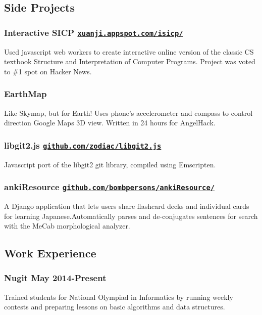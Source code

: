 \documentclass[letterpaper]{article}
\begin{document}
\begin{center}
\section*{Side Projects}
\end{center}
\subsubsection*{Interactive SICP \hfill \href{http://xuanji.appspot.com/isicp/}{\tt xuanji.appspot.com/isicp/}}
Used javascript web workers to create interactive online version of the classic CS textbook Structure and Interpretation of Computer Programs. Project was voted to \#1 spot on Hacker News.

\subsubsection*{EarthMap}
Like Skymap, but for Earth! Uses phone's accelerometer and compass to control direction Google Maps 3D view. Written in 24 hours for AngelHack.

\subsubsection*{libgit2.js \hfill \href{https://github.com/zodiac/libgit2.js}{\tt github.com/zodiac/libgit2.js}}
Javascript port of the libgit2 git library, compiled using Emscripten.

\subsubsection*{ankiResource \hfill \href{https://github.com/bombpersons/ankiResource}{\tt github.com/bombpersons/ankiResource/}}
A Django application that lets users share flashcard decks and individual cards for learning Japanese.Automatically parses and de-conjugates sentences for search with the MeCab morphological analyzer.

\vspace{1em}

\begin{center}
\section*{Work Experience}
\end{center}

\subsubsection*{Nugit \hfill May 2014-Present}
Trained students for National Olympiad in Informatics by running weekly contests and preparing lessons on basic algorithms and data structures.
\end{document}

